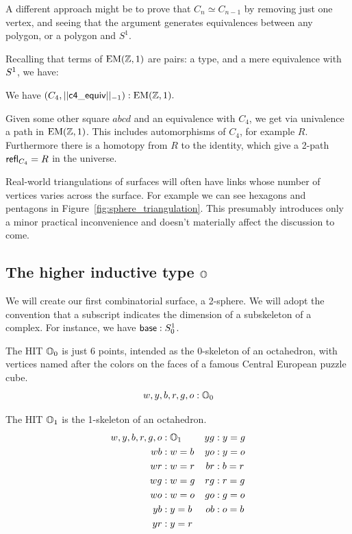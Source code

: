 A different approach might be to prove that \( C_n\simeq C_{n-1} \) by removing just one vertex, and seeing that the argument generates equivalences between any polygon, or a polygon and \( S^1 \).

Recalling that terms of \( \mathrm{EM}(\mathbb{Z},1) \) are pairs: a type, and a mere equivalence with \( S^1 \), we have:

\begin{mycor}
We have \( (C_4,||\mathsf{c4\_equiv}||_{-1}):\mathrm{EM}(\mathbb{Z},1). \)
\end{mycor}

Given some other square \( abcd \) and an equivalence with \( C_4 \), we get via univalence a path in \( \mathrm{EM}(\mathbb{Z},1) \). This includes automorphisms of \( C_4 \), for example \( R \). Furthermore there is a homotopy from \( R \) to the identity, which give a 2-path \( \mathsf{refl}_{C_4}=R \) in the universe.

Real-world triangulations of surfaces will often have links whose number of vertices varies across the surface. For example we can see hexagons and pentagons in Figure~\ref{fig:sphere_triangulation}. This presumably introduces only a minor practical inconvenience and doesn't materially affect the discussion to come.

\subsection{\texorpdfstring{The higher inductive type \( \mathbb{O} \)}{The higher inductive type O}}

We will create our first combinatorial surface, a 2-sphere. We will adopt the convention that a subscript indicates the dimension of a subskeleton of a complex. For instance, we have \( \mathsf{base}:S^1_0 \).

\begin{mydef}
The HIT \( \mathbb{O}_0 \) is just 6 points, intended as the 0-skeleton of an octahedron, with vertices named after the colors on the faces of a famous Central European puzzle cube.
\[ w, y, b, r, g, o : \mathbb{O}_0 \]
\end{mydef}

\begin{mydef}
The HIT \( \mathbb{O}_1 \) is the 1-skeleton of an octahedron.
\begin{align*}
w, y, b, r, g, o &: \mathbb{O}_1 & yg &: y=g \\
wb &: w=b & yo &: y=o \\
wr &: w=r & br &: b=r \\
wg &: w=g & rg &: r=g \\
wo &: w=o & go &: g=o \\
yb &: y=b & ob &: o=b \\
yr &: y=r
\end{align*}
\end{mydef}


